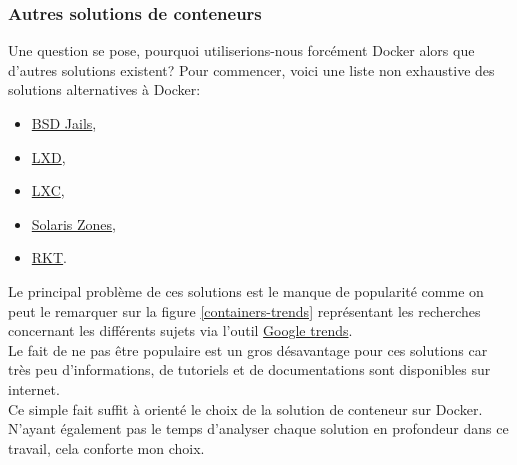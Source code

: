 \documentclass[
    iai, %
    il, %
]{heig-tb}
\begin{document}



\subsubsection{Autres solutions de conteneurs}
Une question se pose, pourquoi utiliserions-nous forcément Docker alors que d'autres solutions existent?
Pour commencer, voici une liste non exhaustive des solutions alternatives à Docker:
\begin{itemize}
    \item \href{https://fr.wikipedia.org/wiki/BSD_Jail}{BSD Jails},
    \item \href{https://linuxcontainers.org/lxd/}{LXD},
    \item \href{https://linuxcontainers.org/lxc/introduction/}{LXC},
    \item \href{https://docs.oracle.com/cd/E18440_01/doc.111/e18415/chapter_zones.htm#OPCUG426}{Solaris Zones},
    \item \href{https://www.redhat.com/en/topics/containers/what-is-rkt}{RKT}.
\end{itemize}

Le principal problème de ces solutions est le manque de popularité comme on peut le remarquer sur la
figure \ref{containers-trends} représentant les recherches concernant les différents sujets via l'outil \href{https://trends.google.fr/trends}{Google trends}.\\
Le fait de ne pas être populaire est un gros désavantage pour ces solutions car très peu d'informations, de tutoriels et de documentations sont disponibles sur internet.\\
Ce simple fait suffit à orienté le choix de la solution de conteneur sur Docker.\\
N'ayant également pas le temps d'analyser chaque solution en profondeur dans ce travail, cela conforte mon choix.
\end{document}
